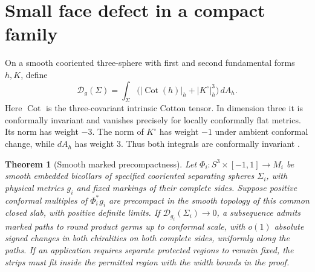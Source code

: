 \documentclass[11pt,letterpaper]{article}
\numberwithin{equation}{section}
\newtheorem{theorem}{Theorem}[section]
\DeclareMathOperator{\Cot}{Cot}
\begin{document}
\section{Small face defect in a compact family}

On a smooth cooriented three-sphere with first and second
fundamental forms \(h,K\), define
\[
 \mathcal D_g(\Sigma)=
 \int_\Sigma\bigl(|\Cot(h)|_h+|K^\circ|_h^3\bigr)\,dA_h .
\]
Here \(\Cot\) is the three-covariant intrinsic Cotton tensor.
In dimension three it is conformally invariant and vanishes
precisely for locally conformally flat metrics. Its norm has
weight \(-3\). The norm of \(K^\circ\) has weight \(-1\) under
ambient conformal change, while \(dA_h\) has weight \(3\).
Thus both integrals are conformally invariant
\cite[\S4.1 and \S6.1]{CurryGover2015Introduction}.

\begin{theorem}[Smooth marked precompactness]\label{thm:compact}
Let \(\Phi_i:S^3\times[-1,1]\to M_i\) be smooth embedded
bicollars of specified cooriented separating spheres \(\Sigma_i\),
with physical metrics \(g_i\) and fixed markings of their complete
sides. Suppose positive conformal multiples of \(\Phi_i^*g_i\)
are precompact in the smooth topology of this common closed slab,
with positive definite limits. If \(\mathcal D_{g_i}(\Sigma_i)\to0\),
a subsequence admits marked paths to round product germs up to
conformal scale, with \(o(1)\) absolute signed changes in both
chiralities on both complete sides, uniformly along the paths.
If an application requires separate protected regions to remain
fixed, the strips must fit inside the permitted region with the
width bounds in the proof.
\end{theorem}
\end{document}
